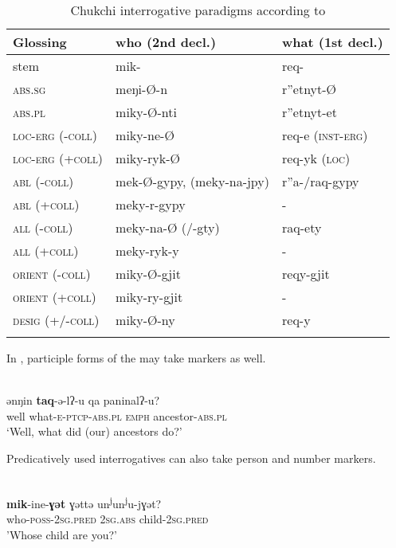 \begin{table}
\caption{Chukchi interrogative paradigms according to \citet[87]{KämpfeVolodin1995}}
\label{tab:chuk:3}

\begin{tabularx}{\textwidth}{Xll}
\lsptoprule

\textbf{Glossing} & \textbf{who (2nd decl.)} & \textbf{what (1st decl.)}\\
\midrule
stem & mik- & req-\\
\textsc{abs.sg} & meŋi-Ø-n & r”etnyt-Ø\\
\textsc{abs.pl} & miky-Ø-nti & r”etnyt-et\\
\textsc{loc-erg (-coll)} & miky-ne-Ø & req-e (\textsc{inst-erg})\\
\textsc{loc-erg (+coll)} & miky-ryk-Ø & req-yk (\textsc{loc})\\
\textsc{abl (-coll)} & mek-Ø-gypy, (meky-na-jpy) & r”a-/raq-gypy\\
\textsc{abl (+coll)} & meky-r-gypy & -\\
\textsc{all (-coll)} & meky-na-Ø (/-gty) & raq-ety\\
\textsc{all (+coll)} & meky-ryk-y & -\\
\textsc{orient (-coll)} & miky-Ø-gjit & reqy-gjit\\
\textsc{orient (+coll)} & miky-ry-gjit & -\\
\textsc{desig (+/-coll)} & miky-Ø-ny & req-y\\
\lspbottomrule
\end{tabularx}
\end{table}

In , participle forms of the  may take  markers as well.

\ea%
    \label{ex:chuk:17}
    \\
    \gll ənŋin \textbf{{taq}}-ə-lʔ-u    qa  paninalʔ-u?\\
    well  what-\textsc{e}-\textsc{ptcp}-\textsc{abs.pl}  \textsc{emph}  ancestor-\textsc{abs.pl}\\
    \glt ‘Well, what did (our) ancestors do?’ \citep[133]{Nagayama2016}
    \z

\noindent Predicatively used interrogatives can also take person and number markers.

\ea%
    \label{ex:chuk:18}
    \\
    \gll \textbf{{mik}}{-ine-}\textbf{{ɣət}} ɣəttə    un\textsuperscript{j}un\textsuperscript{j}u-jɣət?\\
    who-\textsc{poss}-2\textsc{sg.pred}  2\textsc{sg.abs}  child-2\textsc{sg.pred}\\
    \glt 'Whose child are you?' \citep[121]{Nagayama2016}
    \z

